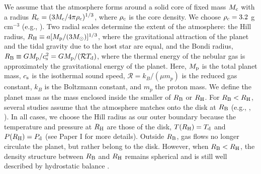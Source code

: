 We assume that the atmosphere forms around a solid core of fixed mass $M_{\rm c}$ with a radius $R_{\rm c}=(3 M_{\rm c}/4 \pi \rho_{\rm c})^{1/3}$, where $\rho_{\rm c}$ is the core density. We choose $\rho_{\rm c}=3.2$ g cm$^{-3}$ (e.g., \citealt{pap99}). Two radial scales determine the extent of the atmosphere: the Hill radius, $R_{\rm H} \equiv a [M_{\rm p} / (3 M_{\odot})]^{1/3}$, where the gravitational attraction of the planet and the tidal gravity due to the host star are equal, and the Bondi radius, $R_{\rm B} \equiv G M_{\rm p}/c_{\rm s}^2=G M_{\rm p} / (\mathcal{R} T_{\rm d})$, where the thermal energy of the nebular gas is approximately the gravitational energy of the planet. Here, $M_{\rm p}$ is the total planet mass, $c_{\rm s}$ is the isothermal sound speed, $\mathcal{R}=k_B/(\mu m_p)$ is the reduced gas constant, $k_B$ is the Boltzmann constant, and $m_p$ the proton mass. We define the planet mass as the mass enclosed inside the smaller of $R_{\rm B}$ or $R_{\rm H}$. For $R_{\rm B}<R_{\rm H}$, several studies assume that the atmosphere matches onto the disk at $R_{\rm B}$ (e.g., \citealt{ikoma00}, \citealt{pollack96}). In all cases, we choose the Hill radius as our outer boundary because the temperature and pressure at $R_{\rm H}$ are those of the disk,  $T(R_{\rm H})=T_{\rm d}$ and $P(R_{\rm H})=P_{\rm d}$ (see Paper I for more details). Outside $R_{\rm B}$, gas flows no longer circulate the planet, but rather belong to the disk. However, when $R_{\rm B}<R_{\rm H}$, the density structure between $R_{\rm B}$ and $R_{\rm H}$ remains spherical and is still well described by hydrostatic balance \citep{ormel13}.  





